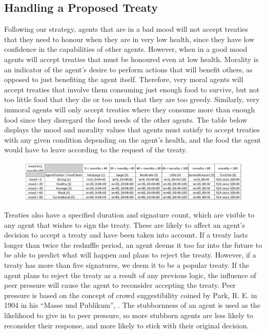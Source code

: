 \subsection{Handling a Proposed Treaty}
Following our strategy, agents that are in a bad mood will not accept treaties that they need to honour when they are in very low health, since they have low confidence in the capabilities of other agents. However, when in a good mood agents will accept treaties that must be honoured even at low health. Morality is an indicator of the agent’s desire to perform actions that will benefit others, as opposed to just benefiting the agent itself. Therefore, very moral agents will accept treaties that involve them consuming just enough food to survive, but not too little food that they die or too much that they are too greedy. Similarly, very immoral agents will only accept treaties where they consume more than enough food since they disregard the food needs of the other agents. The table below displays the mood and morality values that agents must satisfy to accept treaties with any given condition depending on the agent’s health, and the food the agent would have to leave according to the request of the treaty. \par
\begin{figure}[htb]
    \centering
    \includegraphics[width=1\linewidth]{005_team_3_agent_design/images/table2.jpg}
\end{figure}
Treaties also have a specified duration and signature count, which are visible to any agent that wishes to sign the treaty. These are likely to affect an agent’s decision to accept a treaty and have been taken into account. If a treaty lasts longer than twice the reshuffle period, an agent deems it too far into the future to be able to predict what will happen and plans to reject the treaty. However, if a treaty has more than five signatures, we deem it to be a popular treaty. If the agent plans to reject the treaty as a result of any previous logic, the influence of peer pressure will cause the agent to reconsider accepting the treaty. Peer pressure is based on the concept of crowd suggestibility coined by Park, R. E.  in 1904 in his “Masse und Publikum”, \cite{Solr-413687}. The stubbornness of an agent is used as the likelihood to give in to peer pressure, so more stubborn agents are less likely to reconsider their response, and more likely to stick with their original decision. \par

